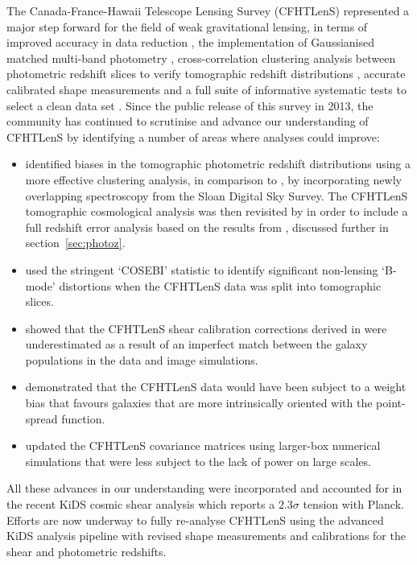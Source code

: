 The Canada-France-Hawaii Telescope Lensing Survey (CFHTLenS) represented a major step forward for the field of weak gravitational lensing, in terms of improved accuracy in data reduction \citep{erben/etal:2013}, the implementation of Gaussianised matched multi-band photometry \citep{hildebrandt/etal:2012}, cross-correlation clustering analysis between photometric redshift slices to verify tomographic redshift distributions \citep{benjamin/etal:2013}, accurate calibrated shape measurements \citep{miller/etal:2013} and a full suite of informative systematic tests to select a clean data set \citep{heymans/etal:2012}.    Since the public release of this survey in 2013, the community has continued to scrutinise and advance our understanding of CFHTLenS by identifying a number of areas where analyses could improve:
\begin{itemize}
\item{\citet{choi/etal:2016} identified biases in the tomographic photometric redshift distributions using a more effective clustering analysis, in comparison to \citet{benjamin/etal:2013}, by incorporating newly overlapping spectroscopy from the Sloan Digital Sky Survey.  The CFHTLenS tomographic cosmological analysis was then revisited by \citet{joudaki/etal:2016} in order to include a full redshift error analysis based on the results from \citet{choi/etal:2016}, discussed further in section~\ref{sec:photoz}.}
\item{\citet{asgari/etal:2016} used the stringent `COSEBI' statistic to identify significant non-lensing `B-mode' distortions when the CFHTLenS data was split into tomographic slices.}
\item{\citet{kuijken/etal:2015} showed that the CFHTLenS shear calibration corrections derived in \citet{miller/etal:2013} were underestimated as a result of an imperfect match between the galaxy populations in the data and image simulations.}
\item{\citet{fenechconti/etal:2016} demonstrated that the CFHTLenS data would have been subject to a weight bias that favours galaxies that are more intrinsically oriented with the point-spread function.}
\item{\citet{joudaki/etal:2016} updated the CFHTLenS covariance matrices using larger-box numerical simulations that were less subject to the lack of power on large scales.}
\end{itemize}
All these advances in our understanding were incorporated and accounted for in the recent KiDS cosmic shear analysis \citep{hildebrandt/etal:2016} which reports a $2.3 \sigma$ tension with Planck.  Efforts are now underway to fully re-analyse CFHTLenS using the advanced KiDS analysis pipeline with revised shape measurements and calibrations for the shear and photometric redshifts.  

